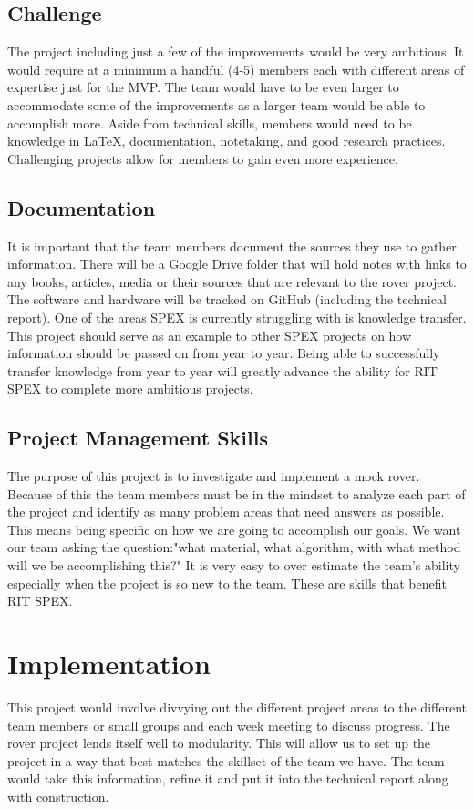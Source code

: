 \documentclass[conference]{IEEEtran} %
\begin{document}
\subsection{Challenge}
\label{subsec:challenge}
The project including just a few of the improvements would be very ambitious. 
It would require at a minimum a handful (4-5) members each with different areas of expertise just for the MVP.
The team would have to be even larger to accommodate some of the improvements as a larger team would be able to accomplish more. 
Aside from technical skills, members would need to be knowledge in \LaTeX{}, documentation, notetaking, and good research practices. 
Challenging projects allow for members to gain even more experience. 

\subsection{Documentation}
\label{subsec:docs}
It is important that the team members document the sources they use to gather information. 
There will be a Google Drive folder that will hold notes with links to any books, articles, media or their sources that are relevant to the rover project. 
The software and hardware will be tracked on GitHub (including the technical report).
One of the areas SPEX is currently struggling with is knowledge transfer.
This project should serve as an example to other SPEX projects on how information should be passed on from year to year.
Being able to successfully transfer knowledge from year to year will greatly advance the ability for RIT SPEX to complete more ambitious projects.

\subsection{Project Management Skills}
\label{subsec:project-management}
The purpose of this project is to investigate and implement a mock rover.
Because of this the team members must be in the mindset to analyze each part of the project and identify as many problem areas that need answers as possible. 
This means being specific on how we are going to accomplish our goals.
We want our team asking the question:"what material, what algorithm, with what method will we be accomplishing this?"
It is very easy to over estimate the team's ability especially when the project is so new to the team.
These are skills that benefit RIT SPEX. 

\section{Implementation}
\label{sec:implementation}
This project would involve divvying out the different project areas to the different team members or small groups and each week meeting to discuss progress.
The rover project lends itself well to modularity.
This will allow us to set up the project in a way that best matches the skillset of the team we have. 
The team would take this information, refine it and put it into the technical report along with construction. 
\end{document}
